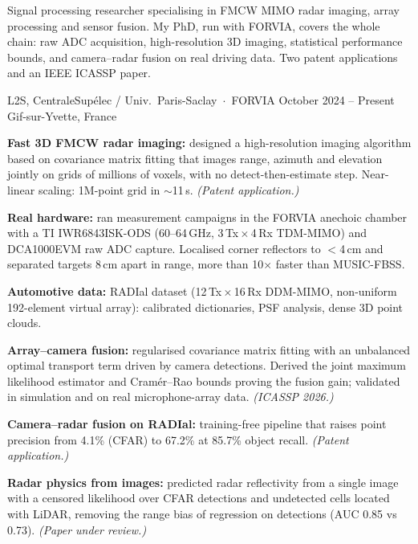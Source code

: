 




\noindent
Signal processing researcher specialising in FMCW MIMO radar imaging, array processing and
sensor fusion. My PhD, run with FORVIA, covers the whole chain: raw ADC acquisition,
high-resolution 3D imaging, statistical performance bounds, and camera--radar fusion on real
driving data. Two patent applications and an IEEE ICASSP paper.
\vspace{1pt}


%
        {L2S, CentraleSupélec / Univ.\ Paris-Saclay \,$\cdot$\, FORVIA}%
        {October 2024 -- Present}%
        {Gif-sur-Yvette, France}
\begin{cvitems}
  \item \textbf{Fast 3D FMCW radar imaging:} designed a high-resolution imaging algorithm based on
        covariance matrix fitting that images range, azimuth and elevation jointly on grids of
        millions of voxels, with no detect-then-estimate step. Near-linear scaling: 1M-point
        grid in $\sim$11\,s. \emph{(Patent application.)}
  \item \textbf{Real hardware:} ran measurement campaigns in the FORVIA anechoic chamber with a TI
        IWR6843ISK-ODS (60--64\,GHz, 3\,Tx\,$\times$\,4\,Rx TDM-MIMO) and DCA1000EVM raw ADC
        capture. Localised corner reflectors to $<$4\,cm and separated targets 8\,cm apart
        in range, more than 10$\times$ faster than MUSIC-FBSS.
  \item \textbf{Automotive data:} RADIal dataset (12\,Tx\,$\times$\,16\,Rx DDM-MIMO, non-uniform
        192-element virtual array): calibrated dictionaries, PSF analysis, dense 3D point clouds.
  \item \textbf{Array--camera fusion:} regularised covariance matrix fitting with an unbalanced
        optimal transport term driven by camera detections. Derived the joint maximum likelihood
        estimator and Cramér--Rao bounds proving the fusion gain; validated in simulation and
        on real microphone-array data. \emph{(ICASSP 2026.)}
  \item \textbf{Camera--radar fusion on RADIal:} training-free pipeline that raises point precision
        from 4.1\% (CFAR) to 67.2\% at 85.7\% object recall. \emph{(Patent application.)}
  \item \textbf{Radar physics from images:} predicted radar reflectivity from a single image with a
        censored likelihood over CFAR detections and undetected cells located with LiDAR, removing
        the range bias of regression on detections (AUC 0.85 vs 0.73). \emph{(Paper under review.)}
\end{cvitems}

